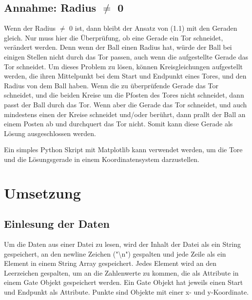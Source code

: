 \documentclass[a4paper,10pt,ngerman]{scrartcl}
\begin{document}
\subsection{Annahme: Radius $\neq$ 0}
Wenn der Radius $\neq$ 0 ist, dann bleibt der Ansatz von (1.1) mit den Geraden gleich. Nur muss hier die Überprüfung, ob eine Gerade ein Tor schneidet, verändert werden. Denn wenn der Ball einen Radius hat, würde der Ball bei einigen Stellen nicht durch das Tor passen, auch wenn die 
aufgestellte Gerade das Tor schneidet. Um dieses Problem zu lösen, können Kreisgleichungen aufgestellt werden, die ihren Mittelpunkt bei dem Start und Endpunkt eines Tores, und den Radius von dem Ball haben. Wenn die zu überprüfende Gerade das Tor schneidet, und die beiden Kreise 
um die Pfosten des Tores nicht schneidet, dann passt der Ball durch das Tor. Wenn aber die Gerade das Tor schneidet, und auch mindestens einen der Kreise schneidet und/oder berührt, dann prallt der Ball an einem Posten ab und durchquert das Tor nicht. Somit kann diese Gerade als Lösung 
ausgeschlossen werden.
\newline

Ein simples Python Skript mit Matplotlib kann verwendet werden, um die Tore und die Lösungsgerade in einem Koordinatensystem darzustellen.

\section{Umsetzung}

\subsection{Einlesung der Daten}
Um die Daten aus einer Datei zu lesen, wird der Inhalt der Datei als ein String gespeichert, an den newline Zeichen ("\textbackslash n") gespalten und jede Zeile als ein Element in einem String Array gespeichert. Jedes Element wird an den Leerzeichen gespalten, um an die Zahlenwerte zu kommen, die als Attribute in einem 
Gate Objekt gespeichert werden. Ein Gate Objekt hat jeweils einen Start und Endpunkt als Attribute. Punkte sind Objekte mit einer x- und y-Koordinate. 
\end{document}

